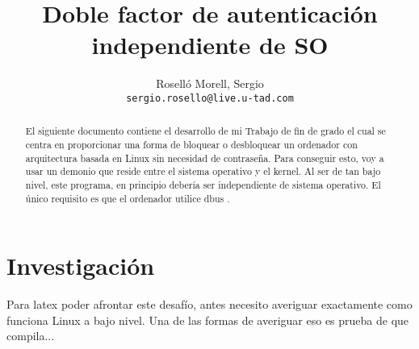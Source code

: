 \documentclass[titlepage]{article}
\title{Doble factor de autenticación independiente de SO}
\author{Roselló Morell, Sergio\\
\texttt{sergio.rosello@live.u-tad.com}}
\begin{document}
\maketitle
\tableofcontents

\begin{abstract}
El siguiente documento contiene el desarrollo de mi Trabajo de fin de grado el cual se centra en proporcionar una forma de bloquear o desbloquear un ordenador con arquitectura basada en Linux sin necesidad de contraseña. Para conseguir esto, voy a usar un demonio que reside entre el sistema operativo y el kernel. Al ser de tan bajo nivel, este programa, en principio debería ser independiente de sistema operativo. El único requisito es que el ordenador utilice \Gls{dbus} \cite{dbus}. 
\end{abstract}
\section{Investigación}
Para \Gls{latex} poder afrontar este desafío, antes necesito averiguar exactamente como funciona Linux a bajo nivel. Una de las formas de averiguar eso es prueba de que compila...
\clearpage
\printglossaries
\clearpage
\printbibliography[heading=bibintoc,title={Bibliografía}]
\end{document}
